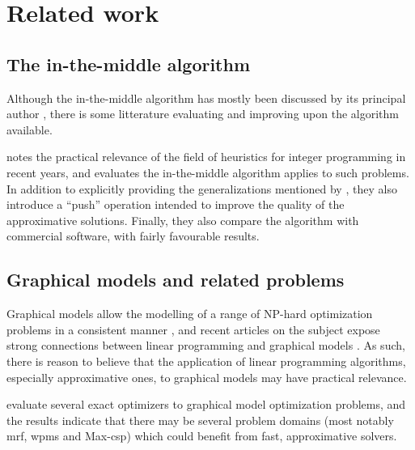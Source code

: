 \section{Related work}

\subsection{The in-the-middle algorithm}
Although the in-the-middle algorithm has mostly been discussed by its principal author \parencites{Wedelin95}{Wedelin08}{Wedelin13}{Alefragis00}, there is some litterature evaluating and improving upon the algorithm available.

\Textcite{Bastert10} notes the practical relevance of the field of heuristics for integer programming in recent years, and evaluates the in-the-middle algorithm applies to such problems. In addition to explicitly providing the generalizations mentioned by \textcite{Wedelin95}, they also introduce a \enquote{push} operation intended to improve the quality of the approximative solutions. Finally, they also compare the algorithm with commercial software, with fairly favourable results.


\subsection{Graphical models and related problems}
Graphical models allow the modelling of a range of NP-hard optimization problems in a consistent manner \parencite{deGivry14}, and recent articles on the subject expose strong connections between linear programming and graphical models \parencites{Werner07}{Kolmogorov13}.
As such, there is reason to believe that the application of linear programming algorithms, especially approximative ones, to graphical models may have practical relevance.

\Textcite{deGivry14} evaluate several exact optimizers to graphical model optimization problems, and the results indicate that there may be several problem domains (most notably \acrshort{mrf}, \acrshort{wpms} and Max-\acrshort{csp}) which could benefit from fast, approximative solvers.
